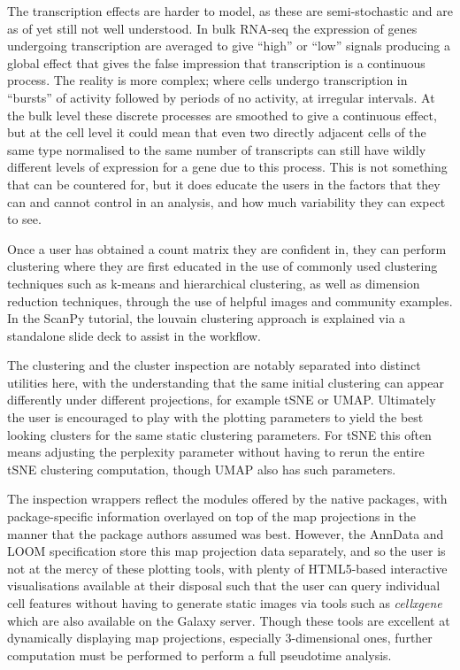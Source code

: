 \documentclass[a4paper,num-refs]{oup-contemporary}
\newcommand{\prog}[1]{\textit{#1}}
\begin{document}
The transcription effects are harder to model, as these are semi-stochastic and are as of yet still not well understood. In bulk RNA-seq the expression of genes undergoing transcription are averaged to give ``high'' or ``low'' signals producing a global effect that gives the false impression that transcription is a continuous process. The reality is more complex; where cells undergo transcription in ``bursts'' of activity followed by periods of no activity, at irregular intervals. At the bulk level these discrete processes are smoothed to give a continuous effect, but at the cell level it could mean that even two directly adjacent cells of the same type normalised to the same number of transcripts can still have wildly different levels of expression for a gene due to this process. This is not something that can be countered for, but it does educate the users in the factors that they can and cannot control in an analysis, and how much variability they can expect to see.

Once a user has obtained a count matrix they are confident in, they can perform clustering where they are first educated in the use of commonly used clustering techniques such as k-means and hierarchical clustering, as well as dimension reduction techniques, through the use of helpful images and community examples.
In the ScanPy tutorial, the louvain clustering approach is explained via a standalone slide deck to assist in the workflow.

The clustering and the cluster inspection are notably separated into distinct utilities here, with the understanding that the same initial clustering can appear differently under different projections, for example tSNE or UMAP. Ultimately the user is encouraged to play with the plotting parameters to yield the best looking clusters for the same static clustering parameters. For tSNE this often means adjusting the perplexity parameter without having to rerun the entire tSNE clustering computation, though UMAP also has such parameters.

The inspection wrappers reflect the modules offered by the native packages, with package-specific information overlayed on top of the map projections in the manner that the package authors assumed was best. However, the AnnData and LOOM specification store this map projection data separately, and so the user is not at the mercy of these plotting tools, with plenty of HTML5-based interactive visualisations available at their disposal such that the user can query individual cell features without having to generate static images via tools such as \prog{cellxgene} which are also available on the Galaxy server. Though these tools are excellent at dynamically displaying map projections, especially 3-dimensional ones, further computation must be performed to perform a full pseudotime analysis.
\end{document}
